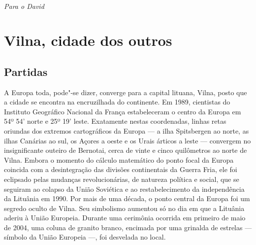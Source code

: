\chapter*{}
\thispagestyle{empty}

\vfill
\hfill\textit{Para o David}

\part[Vilna, cidade dos outros]{Vilna, cidade dos outros}

\chapter{Partidas}

\begin{epigraphs} 
\end{epigraphs}

A Europa toda, pode"-se dizer, converge para a capital lituana, Vilna,
posto que a cidade se encontra na encruzilhada do continente. Em 1989,
cientistas do Instituto Geográfico Nacional da França estabeleceram o
centro da Europa em 54º 54' norte e 25º 19' leste. Exatamente nestas
coordenadas, linhas retas oriundas dos extremos cartográficos da Europa
--- a ilha Spitsbergen ao norte, as ilhas Canárias ao sul, os Açores a
oeste e os Urais árticos a leste --- convergem no insignificante outeiro
de Bernotai, cerca de vinte e cinco quilômetros ao norte de Vilna.
Embora o momento do cálculo matemático do ponto focal da Europa coincida
com a desintegração das divisões continentais da Guerra Fria, ele foi
eclipsado pelas mudanças revolucionárias, de natureza política e social,
que se seguiram ao colapso da União Soviética e ao restabelecimento da
independência da Lituânia em 1990. Por mais de uma década, o ponto
central da Europa foi um segredo oculto de Vilna. Seu simbolismo
aumentou só no dia em que a Lituânia aderiu à União Europeia. Durante
uma cerimônia ocorrida em primeiro de maio de 2004, uma coluna de
granito branco, encimada por uma grinalda de estrelas --- símbolo da União
Europeia ---, foi desvelada no local.

